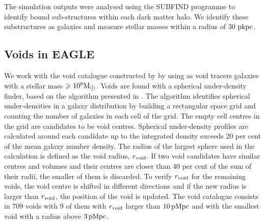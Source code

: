 \documentclass[a4paper,fleqn,usenatbib,letter]{mnras}
\newcommand{\Msun}{\rm M_{\sun}}
\newcommand{\pkpc}{\rm pkpc}
\newcommand{\pMpc}{\rm pMpc}
\newcommand{\Rvoid}{r_{\rm void} }
\begin{document}
The  simulation outputs were analysed using the SUBFIND programme
to identify bound sub-structures \citep{springel2001,dolag2009} within each dark matter halo. We
identify these substructures as galaxies and measure stellar
masses within a radius of 30 $\pkpc$. 


\subsection{Voids in EAGLE}

We work with the void catalogue constructed by \cite*{paillas2017} by using as void tracers galaxies with a stellar mass $\geq 10^8\Msun$. 
Voids are found with a spherical under-density finder, based on the algorithm presented in \citealt{padilla2005}. The algorithm identifies spherical under-densities in a galaxy distribution by building a rectangular space grid and counting the number of galaxies in each cell of the grid. The empty cell centres in the grid are candidates to be void centres. Spherical under-density profiles are calculated around each candidate up to the integrated density exceeds 20 per cent of the mean galaxy number density. The radius of the largest sphere used in the calculation is defined as the void radius, $\Rvoid$. If two void candidates have  similar centres and volumes and  their centres are  closer than 40 per cent of the sum of their radii, the smaller of them  is discarded. To verify $\Rvoid$ for the remaining voids, the void centre is shifted in different directions and if the new radius is larger than $\Rvoid$, the position of the void is updated. The void catalogue consists in 709 voids with 9 of them with $\Rvoid$ larger than $10\,\pMpc$ and with the smallest void with a radius above $3\,\pMpc$.
\end{document}
